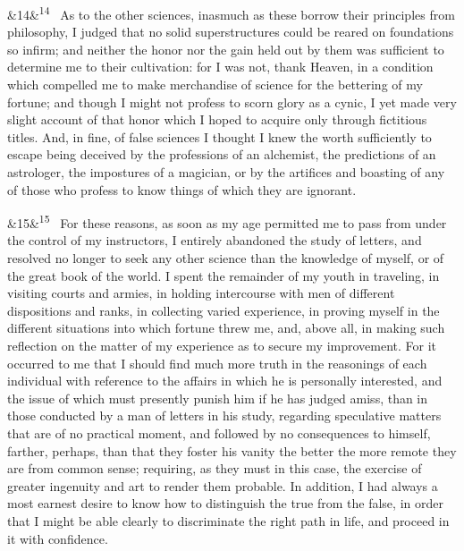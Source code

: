 \documentclass[12pt]{article}
\newcommand{\para}[1][]{\par\noindent\ifx&#1&\else\textsuperscript{\footnotesize #1}~\fi}
\begin{document}
\para[14] As to the other sciences, inasmuch as these borrow their principles from philosophy, I judged that no solid superstructures could be reared on foundations so infirm; and neither the honor nor the gain held out by them was sufficient to determine me to their cultivation: for I was not, thank Heaven, in a condition which compelled me to make merchandise of science for the bettering of my fortune; and though I might not profess to scorn glory as a cynic, I yet made very slight account of that honor which I hoped to acquire only through fictitious titles. And, in fine, of false sciences I thought I knew the worth sufficiently to escape being deceived by the professions of an alchemist, the predictions of an astrologer, the impostures of a magician, or by the artifices and boasting of any of those who profess to know things of which they are ignorant.

\para[15] For these reasons, as soon as my age permitted me to pass from under the control of my instructors, I entirely abandoned the study of letters, and resolved no longer to seek any other science than the knowledge of myself, or of the great book of the world. I spent the remainder of my youth in traveling, in visiting courts and armies, in holding intercourse with men of different dispositions and ranks, in collecting varied experience, in proving myself in the different situations into which fortune threw me, and, above all, in making such reflection on the matter of my experience as to secure my improvement. For it occurred to me that I should find much more truth in the reasonings of each individual with reference to the affairs in which he is personally interested, and the issue of which must presently punish him if he has judged amiss, than in those conducted by a man of letters in his study, regarding speculative matters that are of no practical moment, and followed by no consequences to himself, farther, perhaps, than that they foster his vanity the better the more remote they are from common sense; requiring, as they must in this case, the exercise of greater ingenuity and art to render them probable. In addition, I had always a most earnest desire to know how to distinguish the true from the false, in order that I might be able clearly to discriminate the right path in life, and proceed in it with confidence.
\end{document}
